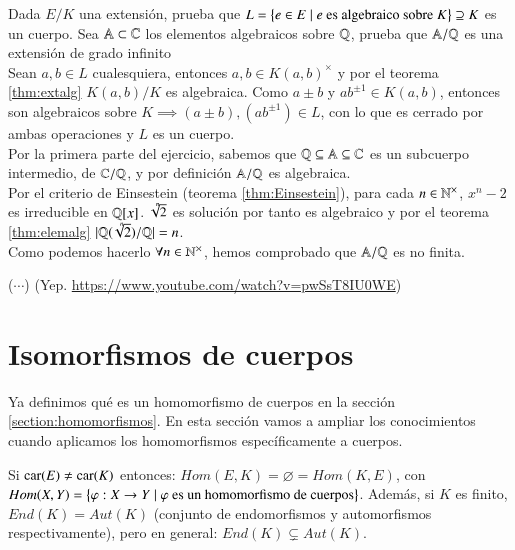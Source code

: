\begin{ex}[H2.7]
    Dada $E/K$ una extensión, prueba que $L = \left\{e \in E \mid e \text{ es algebraico sobre } K\right\} \supseteq K $ es un cuerpo. Sea $\mathbb{A} \subset \mathbb{C}$ los elementos algebraicos sobre $\mathbb{Q}$, prueba que $\mathbb{A}/\mathbb{Q}$ es una extensión de grado infinito\\
    Sean $a, b \in L$ cualesquiera, entonces $a, b \in K(a, b)^\times$ y por el teorema \ref{thm:extalg} $K(a,b)/K$ es algebraica. Como $a \pm b$ y $ab^{\pm 1} \in K(a, b)$, entonces son algebraicos sobre $K \implies (a \pm b), (ab^{\pm 1}) \in L$, con lo que es cerrado por ambas operaciones y $L$ es un cuerpo.\\
    Por la primera parte del ejercicio, sabemos que $\mathbb{Q} \subseteq \mathbb{A} \subseteq \mathbb{C}$ es un subcuerpo intermedio, de $\mathbb{C}/\mathbb{Q}$, y por definición $\mathbb{A}/\mathbb{Q}$ es algebraica.\\
    Por el criterio de Einsestein (teorema \ref{thm:Einsestein}), para cada $n \in \mathbb{N}^\times$, $x^n - 2$ es irreducible en $\mathbb{Q}[x]$. $\sqrt[\leftroot{-3}\uproot{3}n]{2}$ es solución por tanto es algebraico y por el teorema \ref{thm:elemalg} $|\Q(\sqrt[\leftroot{-3}\uproot{3}n]{2})/\Q|=n$.\\
    Como podemos hacerlo $\forall n \in \mathbb{N}^\times$, hemos comprobado que $\mathbb{A}/\mathbb{Q}$ es no finita.
\end{ex}

\begin{ex}[H2.6]
    ($\cdots$) (Yep. \url{https://www.youtube.com/watch?v=pwSsT8IU0WE})
\end{ex}

\section{Isomorfismos de cuerpos}

Ya definimos qué es un homomorfismo de cuerpos en la sección \ref{section:homomorfismos}. En esta sección vamos a ampliar los conocimientos cuando aplicamos los homomorfismos específicamente a cuerpos.

\begin{obs}
    Si $\mathrm{car}(E) \neq \mathrm{car}(K)$ entonces: $Hom(E, K) = \varnothing = Hom(K, E)$, con $Hom(X, Y) = \left\{\varphi: X \to Y \mid \varphi \text{ es un homomorfismo de cuerpos}\right\}$. Además, si $K$ es finito, $End(K) = Aut(K)$ (conjunto de endomorfismos y automorfismos respectivamente), pero en general: $End(K) \subsetneq Aut(K)$. %
\end{obs}

